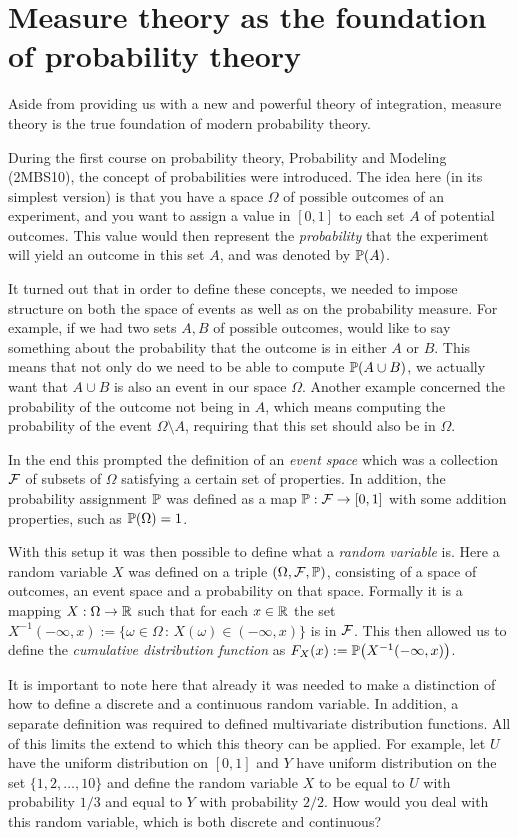 \section{Measure theory as the foundation of probability theory}

Aside from providing us with a new and powerful theory of integration, measure theory is the true foundation of modern probability theory. 

During the first course on probability theory, Probability and Modeling (2MBS10), the concept of probabilities were introduced. The idea here (in its simplest version) is that you have a space $\Omega$ of possible outcomes of an experiment, and you want to assign a value in $[0,1]$ to each set $A$ of potential outcomes. This value would then represent the \emph{probability} that the experiment will yield an outcome in this set $A$, and was denoted by $\mathbb P\!\left(A\right)$. 

It turned out that in order to define these concepts, we needed to impose structure on both the space of events as well as on the probability measure. For example, if we had two sets $A, B$ of possible outcomes, would like to say something about the probability that the outcome is in either $A$ or $B$. This means that not only do we need to be able to compute $\mathbb P\!\left(A \cup B\right)$, we actually want that $A \cup B$ is also an event in our space $\Omega$. Another example concerned the probability of the outcome not being in $A$, which means computing the probability of the event $\Omega\setminus A$, requiring that this set should also be in $\Omega$. 

In the end this prompted the definition of an \emph{event space} which was a collection $\mathcal F$ of subsets of $\Omega$ satisfying a certain set of properties. In addition, the probability assignment $\mathbb P$ was defined as a map $\mathbb P : \mathcal F \to [0,1]$ with some addition properties, such as $\mathbb P\!\left(\Omega\right) = 1$.


With this setup it was then possible to define what a \emph{random variable} is. Here a random variable $X$ was defined on a triple $(\Omega, \mathcal F, \mathbb P)$, consisting of a space of outcomes, an event space and a probability on that space. Formally it is a mapping $X : \Omega \to \mathbb R$ such that for each $x \in \mathbb R$ the set $X^{-1}(-\infty,x):=\{\omega \in \Omega \, : \, X(\omega) \in (-\infty,x)\}$ is in $\mathcal F$. This then allowed us to define the \emph{cumulative distribution function} as $F_X(x) := \mathbb P\!\left(X^{-1}(-\infty,x)\right)$.

It is important to note here that already it was needed to make a distinction of how to define a discrete and a continuous random variable. In addition, a separate definition was required to defined multivariate distribution functions. All of this limits the extend to which this theory can be applied. For example, let $U$ have the uniform distribution on $[0,1]$ and $Y$ have uniform distribution on the set $\{1,2, \dots, 10\}$ and define the random variable $X$ to be equal to $U$ with probability $1/3$ and equal to $Y$ with probability $2/2$. How would you deal with this random variable, which is both discrete and continuous? 

